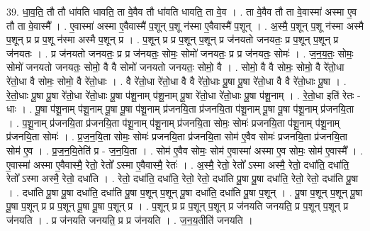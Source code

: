 \documentclass[17pt]{extarticle}
\begin{document}
39. धा॒व॒ति॒ तौ तौ धा॑वति धावति॒ ता वे॒वैव तौ धा॑वति धावति॒ ता वे॒व । . ता वे॒वैव तौ ता वे॒वास्मा॑ अस्मा ए॒व तौ ता वे॒वास्मै᳚ । . ए॒वास्मा॑ अस्मा ए॒वैवास्मै॑ प॒शून् प॒शू न॑स्मा ए॒वैवास्मै॑ प॒शून् । . अ॒स्मै॒ प॒शून् प॒शू न॑स्मा अस्मै प॒शून् प्र प्र प॒शू न॑स्मा अस्मै प॒शून् प्र । . प॒शून् प्र प्र प॒शून् प॒शून् प्र ज॑नयतो जनयतः॒ प्र प॒शून् प॒शून् प्र ज॑नयतः । . प्र ज॑नयतो जनयतः॒ प्र प्र ज॑नयतः॒ सोमः॒ सोमो॑ जनयतः॒ प्र प्र ज॑नयतः॒ सोमः॑ । . ज॒न॒य॒तः॒ सोमः॒ सोमो॑ जनयतो जनयतः॒ सोमो॒ वै वै सोमो॑ जनयतो जनयतः॒ सोमो॒ वै । . सोमो॒ वै वै सोमः॒ सोमो॒ वै रे॑तो॒धा रे॑तो॒धा वै सोमः॒ सोमो॒ वै रे॑तो॒धाः । . वै रे॑तो॒धा रे॑तो॒धा वै वै रे॑तो॒धाः पू॒षा पू॒षा रे॑तो॒धा वै वै रे॑तो॒धाः पू॒षा । . रे॒तो॒धाः पू॒षा पू॒षा रे॑तो॒धा रे॑तो॒धाः पू॒षा प॑शू॒नाम् प॑शू॒नाम् पू॒षा रे॑तो॒धा रे॑तो॒धाः पू॒षा प॑शू॒नाम् । . रे॒तो॒धा इति॑ रेतः - धाः । . पू॒षा प॑शू॒नाम् प॑शू॒नाम् पू॒षा पू॒षा प॑शू॒नाम् प्र॑जनयि॒ता प्र॑जनयि॒ता प॑शू॒नाम् पू॒षा पू॒षा प॑शू॒नाम् प्र॑जनयि॒ता । . प॒शू॒नाम् प्र॑जनयि॒ता प्र॑जनयि॒ता प॑शू॒नाम् प॑शू॒नाम् प्र॑जनयि॒ता सोमः॒ सोमः॑ प्रजनयि॒ता प॑शू॒नाम् प॑शू॒नाम् प्र॑जनयि॒ता सोमः॑ । . प्र॒ज॒न॒यि॒ता सोमः॒ सोमः॑ प्रजनयि॒ता प्र॑जनयि॒ता सोम॑ ए॒वैव सोमः॑ प्रजनयि॒ता प्र॑जनयि॒ता सोम॑ ए॒व । . प्र॒ज॒न॒यि॒तेति॑ प्र - ज॒न॒यि॒ता । . सोम॑ ए॒वैव सोमः॒ सोम॑ ए॒वास्मा॑ अस्मा ए॒व सोमः॒ सोम॑ ए॒वास्मै᳚ । . ए॒वास्मा॑ अस्मा ए॒वैवास्मै॒ रेतो॒ रेतो᳚ ऽस्मा ए॒वैवास्मै॒ रेतः॑ । . अ॒स्मै॒ रेतो॒ रेतो᳚ ऽस्मा अस्मै॒ रेतो॒ दधा॑ति॒ दधा॑ति॒ रेतो᳚ ऽस्मा अस्मै॒ रेतो॒ दधा॑ति । . रेतो॒ दधा॑ति॒ दधा॑ति॒ रेतो॒ रेतो॒ दधा॑ति पू॒षा पू॒षा दधा॑ति॒ रेतो॒ रेतो॒ दधा॑ति पू॒षा । . दधा॑ति पू॒षा पू॒षा दधा॑ति॒ दधा॑ति पू॒षा प॒शून् प॒शून् पू॒षा दधा॑ति॒ दधा॑ति पू॒षा प॒शून् । . पू॒षा प॒शून् प॒शून् पू॒षा पू॒षा प॒शून् प्र प्र प॒शून् पू॒षा पू॒षा प॒शून् प्र । . प॒शून् प्र प्र प॒शून् प॒शून् प्र ज॑नयति जनयति॒ प्र प॒शून् प॒शून् प्र ज॑नयति । . प्र ज॑नयति जनयति॒ प्र प्र ज॑नयति । . ज॒न॒य॒तीति॑ जनयति । \newline
\pagebreak
{}
\end{document}
